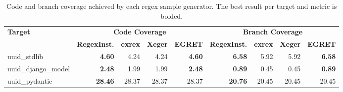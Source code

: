 \begin{table}[t]
\centering
\caption{Code and branch coverage achieved by each regex sample generator. The best result per target and metric is bolded.}
\label{tab:regex-function-coverage}
\small
\begin{tabular}{lrrrrrrrr}
\toprule
\textbf{Target} &
\multicolumn{4}{c}{\textbf{Code Coverage}} &
\multicolumn{4}{c}{\textbf{Branch Coverage}} \\
\cmidrule(lr){2-5}\cmidrule(lr){6-9}
& \textbf{RegexInst.} & \textbf{exrex} & \textbf{Xeger} & \textbf{EGRET} & \textbf{RegexInst.} & \textbf{exrex} & \textbf{Xeger} & \textbf{EGRET} \\
\midrule
uuid\_stdlib & \textbf{4.60} & 4.24 & 4.24 & \textbf{4.60} & \textbf{6.58} & 5.92 & 5.92 & \textbf{6.58} \\
uuid\_django\_model & \textbf{2.48} & 1.99 & 1.99 & \textbf{2.48} & \textbf{0.89} & 0.45 & 0.45 & \textbf{0.89} \\
uuid\_pydantic & \textbf{28.46} & 28.37 & 28.37 & 28.37 & \textbf{20.76} & 20.45 & 20.45 & 20.45 \\
\bottomrule
\end{tabular}
\end{table}
